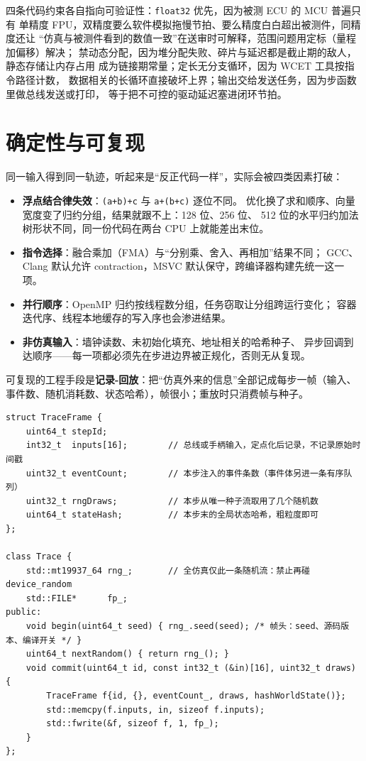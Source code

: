 \documentclass[12pt,a4paper,fontset=fandol]{ctexbook}
\newcommand{\Tp}[1]{\texttt{#1}}
\begin{document}
四条代码约束各自指向可验证性：\Tp{float32} 优先，因为被测 ECU 的 MCU 普遍只有
单精度 FPU，双精度要么软件模拟拖慢节拍、要么精度白白超出被测件，同精度还让
``仿真与被测件看到的数值一致''在送审时可解释，范围问题用定标（量程加偏移）解决；
禁动态分配，因为堆分配失败、碎片与延迟都是截止期的敌人，静态存储让内存占用
成为链接期常量；定长无分支循环，因为 WCET 工具按指令路径计数，
数据相关的长循环直接破坏上界；输出交给发送任务，因为步函数里做总线发送或打印，
等于把不可控的驱动延迟塞进闭环节拍。

\section{确定性与可复现}
\label{sec:ch15-determinism}

同一输入得到同一轨迹，听起来是``反正代码一样''，实际会被四类因素打破：

\begin{itemize}
  \item \textbf{浮点结合律失效}：\Tp{(a+b)+c} 与 \Tp{a+(b+c)} 逐位不同。
        优化换了求和顺序、向量宽度变了归约分组，结果就跟不上：128 位、256 位、
        512 位的水平归约加法树形状不同，同一份代码在两台 CPU 上就能差出末位。
  \item \textbf{指令选择}：融合乘加（FMA）与``分别乘、舍入、再相加''结果不同；
        GCC、Clang 默认允许 contraction，MSVC 默认保守，跨编译器构建先统一这一项。
  \item \textbf{并行顺序}：OpenMP 归约按线程数分组，任务窃取让分组跨运行变化；
        容器迭代序、线程本地缓存的写入序也会渗进结果。
  \item \textbf{非仿真输入}：墙钟读数、未初始化填充、地址相关的哈希种子、
        异步回调到达顺序——每一项都必须先在步进边界被正规化，否则无从复现。
\end{itemize}

可复现的工程手段是\textbf{记录-回放}：把``仿真外来的信息''全部记成每步一帧（输入、事件数、随机消耗数、状态哈希），帧很小；重放时只消费帧与种子。

\begin{lstlisting}[style=cppstyle, caption={记录端：输入正规化进帧，全仿真只允许一条随机流}, label={lst:ch15-trace}]
struct TraceFrame {
    uint64_t stepId;
    int32_t  inputs[16];        // 总线或手柄输入，定点化后记录，不记录原始时间戳
    uint32_t eventCount;        // 本步注入的事件条数（事件体另进一条有序队列）
    uint32_t rngDraws;          // 本步从唯一种子流取用了几个随机数
    uint64_t stateHash;         // 本步末的全局状态哈希，粗粒度即可
};

class Trace {
    std::mt19937_64 rng_;       // 全仿真仅此一条随机流：禁止再碰 device_random
    std::FILE*      fp_;
public:
    void begin(uint64_t seed) { rng_.seed(seed); /* 帧头：seed、源码版本、编译开关 */ }
    uint64_t nextRandom() { return rng_(); }
    void commit(uint64_t id, const int32_t (&in)[16], uint32_t draws) {
        TraceFrame f{id, {}, eventCount_, draws, hashWorldState()};
        std::memcpy(f.inputs, in, sizeof f.inputs);
        std::fwrite(&f, sizeof f, 1, fp_);
    }
};
\end{lstlisting}
\end{document}

